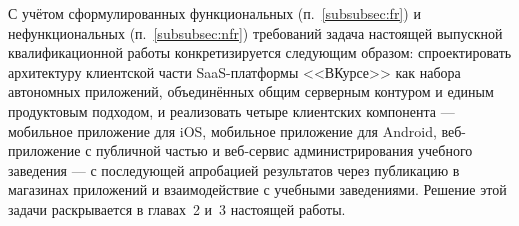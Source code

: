 С учётом сформулированных функциональных (п.~\ref{subsubsec:fr}) и нефункциональных (п.~\ref{subsubsec:nfr}) требований задача настоящей выпускной квалификационной работы конкретизируется следующим образом: спроектировать архитектуру клиентской части SaaS-платформы <<ВКурсе>> как набора автономных приложений, объединённых общим серверным контуром и единым продуктовым подходом, и реализовать четыре клиентских компонента --- мобильное приложение для iOS, мобильное приложение для Android, веб-приложение с публичной частью и веб-сервис администрирования учебного заведения --- с последующей апробацией результатов через публикацию в магазинах приложений и взаимодействие с учебными заведениями. Решение этой задачи раскрывается в главах~2 и~3 настоящей работы.
